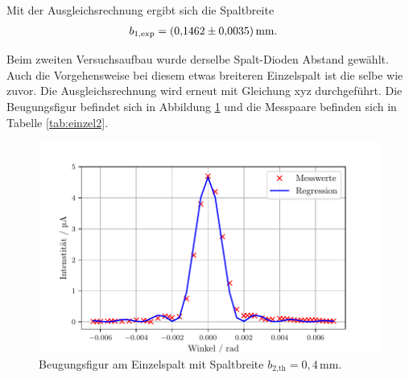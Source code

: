 \noindent Mit der Ausgleichsrechnung ergibt sich die Spaltbreite
\begin{align*}
b_\text{1,exp} &= (\num{0.1462 +- 0.0035})\,\si{\milli\meter}.
\end{align*}

\noindent Beim zweiten Versuchsaufbau wurde derselbe Spalt-Dioden Abstand gewählt. Auch die Vorgehensweise
bei diesem etwas breiteren Einzelspalt ist die selbe wie zuvor. Die Ausgleichsrechnung wird erneut mit Gleichung xyz
durchgeführt. Die Beugungsfigur befindet sich in Abbildung \ref{fig:einzel2} und die Messpaare befinden sich in Tabelle \ref{tab:einzel2}.

\begin{figure}[H]
  \center
  \includegraphics[scale = 0.75]{einzel2.pdf}
  \caption{Beugungsfigur am Einzelspalt mit Spaltbreite $b_\text{2,th} = 0,4\,\si{\milli\meter}$.}
  \label{fig:einzel2}
\end{figure}

